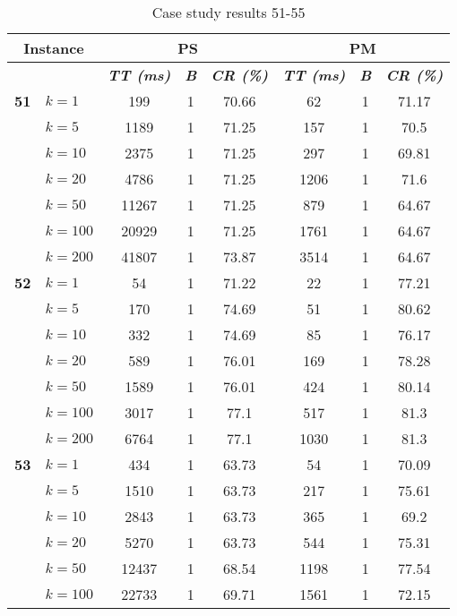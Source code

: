     \begin{table}[htbp]
    \caption{Case study results 51-55}
    \centering
    \begin{tabular}{|l|l|c|c|c|c|c|c|}
    \hline
    \multicolumn{ 2}{|c|}{\textbf{Instance}} & \multicolumn{ 3}{c|}{\textbf{PS}} & \multicolumn{ 3}{c|}{\textbf{PM}} \\ \hline
    \multicolumn{ 2}{|l|}{} & \textbf{\textit{TT (ms)}} & \textbf{\textit{B}} & \textbf{\textit{CR (\%)}} & \textbf{\textit{TT (ms)}} & \textbf{\textit{B}} & \textbf{\textit{CR (\%)}} \\ \hline
    \multicolumn{1}{|r|}{\textbf{51}} & $k=1$ & 199 & 1 & 70.66 & 62 & 1 & 71.17 \\ 
     & $k=5$ & 1189 & 1 & 71.25 & 157 & 1 & 70.5 \\ 
     & $k=10$ & 2375 & 1 & 71.25 & 297 & 1 & 69.81 \\ 
     & $k=20$ & 4786 & 1 & 71.25 & 1206 & 1 & 71.6 \\ 
     & $k=50$ & 11267 & 1 & 71.25 & 879 & 1 & 64.67 \\ 
     & $k=100$ & 20929 & 1 & 71.25 & 1761 & 1 & 64.67 \\ 
     & $k=200$ & 41807 & 1 & 73.87 & 3514 & 1 & 64.67 \\ \hline
    \multicolumn{1}{|r|}{\textbf{52}} & $k=1$ & 54 & 1 & 71.22 & 22 & 1 & 77.21 \\ 
     & $k=5$ & 170 & 1 & 74.69 & 51 & 1 & 80.62 \\ 
     & $k=10$ & 332 & 1 & 74.69 & 85 & 1 & 76.17 \\ 
     & $k=20$ & 589 & 1 & 76.01 & 169 & 1 & 78.28 \\ 
     & $k=50$ & 1589 & 1 & 76.01 & 424 & 1 & 80.14 \\ 
     & $k=100$ & 3017 & 1 & 77.1 & 517 & 1 & 81.3 \\ 
     & $k=200$ & 6764 & 1 & 77.1 & 1030 & 1 & 81.3 \\ \hline
    \multicolumn{1}{|r|}{\textbf{53}} & $k=1$ & 434 & 1 & 63.73 & 54 & 1 & 70.09 \\ 
     & $k=5$ & 1510 & 1 & 63.73 & 217 & 1 & 75.61 \\ 
     & $k=10$ & 2843 & 1 & 63.73 & 365 & 1 & 69.2 \\ 
     & $k=20$ & 5270 & 1 & 63.73 & 544 & 1 & 75.31 \\ 
     & $k=50$ & 12437 & 1 & 68.54 & 1198 & 1 & 77.54 \\ 
     & $k=100$ & 22733 & 1 & 69.71 & 1561 & 1 & 72.15 \\ 

\end{tabular}
\end{table}
